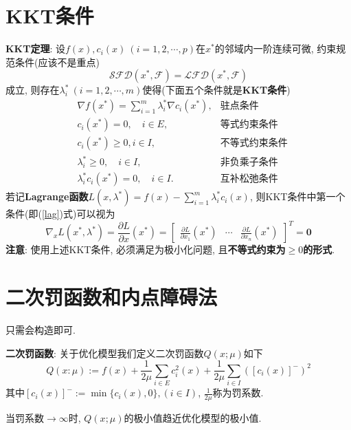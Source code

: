 \documentclass[12pt, a4paper, oneside]{ctexart}
\let\geq=\geqslant %
\def\bd{\boldsymbol}        %
\def\add{\vspace{1ex}}      %
\begin{document}
\section*{KKT条件}
\textbf{KKT定理}: 设$f(x), c_i(x)\ (i=1,2,\cdots, p)$在$x^*$的邻域内一阶连续可微, 约束规范条件(应该不是重点)
\begin{equation*}
    \mathcal{SFD}(x^*, \mathcal{F}) = \mathcal{LFD}(x^*, \mathcal{F})
\end{equation*}
成立, 则存在$\lambda_i^*\ (i=1,2,\cdots, m)$使得(下面五个条件就是\textbf{KKT条件})
\begin{align}
    &\nabla f(x^*) = \sum_{i=1}^m \lambda_i^*\nabla c_i(x^*),&\text{驻点条件}\label{lag}\\
    &c_i(x^*) = 0,\quad i\in E,&\text{等式约束条件}\nonumber\\
    &c_i(x^*)\geq 0, i\in I,&\text{不等式约束条件}\nonumber\\
    &\lambda_i^*\geq 0,\quad i\in I,&\text{非负乘子条件}\nonumber\\
    &\lambda_i^*c_i(x^*) = 0,\quad i\in I.&\text{互补松弛条件}\nonumber
\end{align}
若记\textbf{Lagrange函数}$L(x,\lambda^*) = f(x) - \sum_{i=1}^m\lambda_i^*c_i(x)$, 则KKT条件中第一个条件(即(\ref{lag})式)可以视为
\begin{equation*}
    \nabla_xL(x^*, \lambda^*) = \frac{\partial L}{\partial x}(x^*) = \left[\begin{matrix}
        \frac{\partial L}{\partial x_1}(x^*)&\cdots&\frac{\partial L}{\partial x_n}(x^*)
    \end{matrix}\right]^T = \bd{0}
\end{equation*}
\textbf{注意}: 使用上述KKT条件, 必须满足为极小化问题, 且\textbf{不等式约束为$\geq 0$的形式}.

\section*{二次罚函数和内点障碍法}
只需会构造即可.

\textbf{二次罚函数}: 关于优化模型我们定义二次罚函数$Q(x;\mu)$如下
\begin{equation*}
 Q(x:\mu):= f(x) +\frac{1}{2\mu}\sum_{i\in E}c_i^2(x)+\frac{1}{2\mu}\sum_{i\in I}([c_i(x)]^-)^2   
\end{equation*}
其中$[c_i(x)]^-:=\min\{c_i(x), 0\}, (i\in I)$, $\frac{1}{2\mu}$称为罚系数.\add

当罚系数$\to\infty$时, $Q(x;\mu)$的极小值趋近优化模型的极小值.
\end{document}
